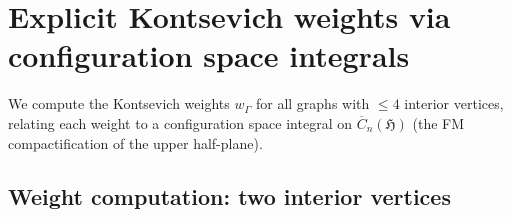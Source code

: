 \section{Explicit Kontsevich weights via configuration space integrals}
\label{sec:kontsevich-weights-explicit}

We compute the Kontsevich weights $w_\Gamma$ for all graphs with
$\leq 4$ interior vertices, relating each weight to a configuration
space integral on $\overline{C}_n(\mathfrak{H})$ (the FM
compactification of the upper half-plane).

\subsection{Weight computation: two interior vertices}
\label{subsec:kontsevich-2vertex}


